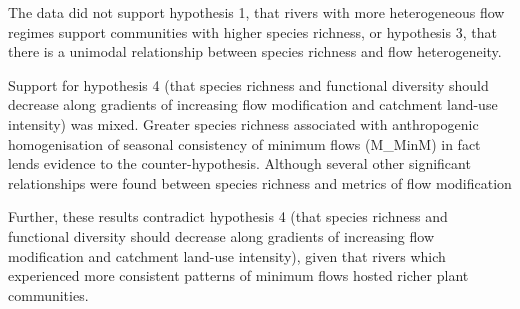 The data did not support hypothesis 1, that rivers with more heterogeneous flow regimes support communities with higher species richness, or hypothesis 3, that there is a unimodal relationship between species richness and flow heterogeneity. 

Support for hypothesis 4 (that species richness and functional diversity should decrease along gradients of increasing flow modification and catchment land-use intensity) was mixed. Greater species richness associated with anthropogenic homogenisation of seasonal consistency of minimum flows (M_MinM) in fact lends evidence to the counter-hypothesis. Although several other significant relationships were found between species richness and metrics of flow modification 

Further, these results contradict hypothesis 4 (that species richness and functional diversity should decrease along gradients of increasing flow modification and catchment land-use intensity), given that rivers which experienced more consistent patterns of minimum flows hosted richer plant communities.